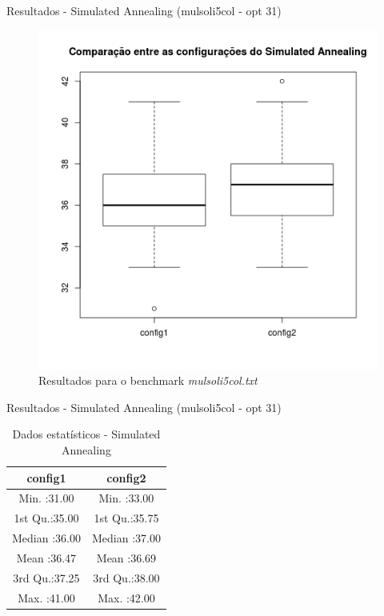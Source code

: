\documentclass[compress, hide notes]{beamer}
\begin{document}
        
        \begin{frame}{Resultados - Simulated Annealing (mulsoli5col - opt 31)}
        
        	\begin{figure}[H]
			\centering
            \label{fig:sol-sa-mulsoli5col}
            \includegraphics[width=0.5\linewidth]{img/sa-sol-mulsoli5col.png}
            \caption[Resultados para o benchmark mulsoli5col.txt]{Resultados para o benchmark \textit{mulsoli5col.txt}}
			\end{figure}

		\end{frame}
        
        \begin{frame}{Resultados - Simulated Annealing (mulsoli5col - opt 31)}
        
        	\begin{table}[H]
            \centering
              \begin{tabular}{c|c}
               \textbf{config1}       &  \textbf{config2}                        \\ \hline \hline
               Min.   :31.00 &          Min.   :33.00          \\ \hline
               1st Qu.:35.00 &          1st Qu.:35.75          \\ \hline
               Median :36.00 &          Median :37.00          \\ \hline
               Mean   :36.47 &          Mean   :36.69          \\ \hline
               3rd Qu.:37.25 &          3rd Qu.:38.00          \\ \hline
               Max.   :41.00 &         Max.   :42.00           \\ 
              \end{tabular}
              \caption {Dados estatísticos - Simulated Annealing}
        	\end{table}

		\end{frame}
        
\end{document}
